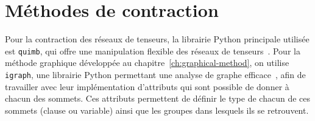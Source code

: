 

\section{Méthodes de contraction}\label{sec:contraction-order-methods}
Pour la contraction des réseaux de tenseurs, la librairie Python principale utilisée est \verb|quimb|, qui offre une manipulation flexible des réseaux de tenseurs~\cite{gray2018quimb}.
Pour la méthode graphique développée au chapitre~\ref{ch:graphical-method}, on utilise \verb|igraph|, une librairie Python permettant une analyse de graphe efficace~\cite{csardi_igraph_nodate}, afin de travailler avec leur implémentation d'attributs qui sont possible de donner à chacun des sommets.
Ces attributs permettent de définir le type de chacun de ces sommets (clause ou variable) ainsi que les groupes dans lesquels ils se retrouvent.

